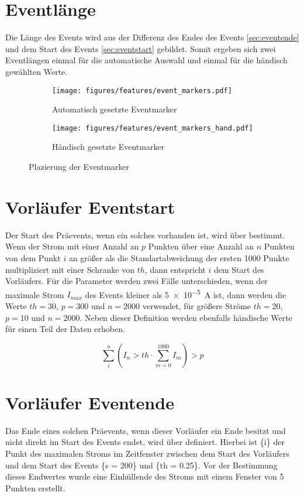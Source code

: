 \section{Eventlänge}
\label{sec:eventlen}
Die Länge des Events wird aus der Differenz des Endes des Events \ref{sec:eventende} und dem Start des Events \ref{sec:eventstart} gebildet. Somit ergeben sich zwei Eventlängen einmal für die automatische Auswahl und einmal für die händisch gewählten Werte. 
\begin{figure}[H]
  \centering
  \begin{subfigure}[t]{0.48\textwidth}
    \centering
    \texttt{[image: figures/features/event\_markers.pdf]}
    \caption{Automatisch gesetzte Eventmarker} 
    \label{fig:event_markers_auto}
  \end{subfigure}
  \begin{subfigure}[t]{0.48\textwidth}
    \centering
    \texttt{[image: figures/features/event\_markers\_hand.pdf]}
    \caption{Händisch gesetzte Eventmarker}
    \label{fig:event_markers_hand}
  \end{subfigure}
  \caption{Plazierung der Eventmarker}
  \label{fig:event_markers}
\end{figure}


\section{Vorläufer Eventstart}
\label{sec:preeventstart}
Der Start des Präevents, wenn ein solches vorhanden ist, wird über  bestimmt. Wenn der Strom mit einer Anzahl an \(p\) Punkten über eine Anzahl an \(n\) Punkten von dem Punkt \(i\) an größer als die Standartabweichung der ersten 1000 Punkte multipliziert mit einer Schranke von \(th\), dann entspricht \(i\) dem Start des Vorläufers. Für die Parameter werden zwei Fälle unterschieden, wenn der maximale Strom \(I_{max}\) des Events kleiner als \SI{5e-5}{\ampere} ist, dann werden die Werte \(th = 30\), \(p = 300\) und \(n = 2000\) verwendet, für größere Ströme \(th = 20\), \(p = 10\) und \(n=2000\). Neben dieser Definition werden ebenfalls händische Werte für einen Teil der Daten erhoben.

\begin{equation}
  \sum_i^n (I_n > th \cdot \sum_{m=0}^{1000} I_m) > p 
  \label{eq:preevent_start} 
\end{equation}

\section{Vorläufer Eventende}
\label{sec.preeventend}
Das Ende eines solchen Präevents, wenn dieser Vorläufer ein Ende besitzt und nicht direkt im Start des Events endet, wird über  definiert. Hierbei ist \{i\} der Punkt des maximalen Stroms im Zeitfenster zwischen dem Start des Vorläufers und dem Start des Events \{s = 200\} und \{th = 0.25\}. Vor der Bestimmung dieses Endwertes wurde eine Einhüllende des Stroms mit einem Fenster von 5 Punkten erstellt.

